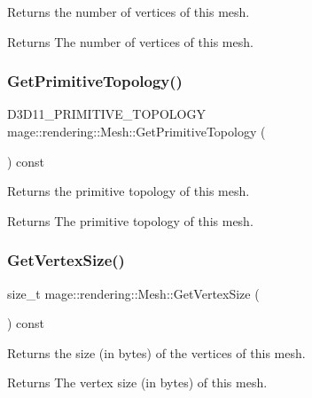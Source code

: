 Returns the number of vertices of this mesh.

\begin{DoxyReturn}{Returns}
The number of vertices of this mesh. 
\end{DoxyReturn}
\hypertarget{classmage_1_1rendering_1_1_mesh_af6cead725f7e5352a90a8f8847580f75}{}\label{classmage_1_1rendering_1_1_mesh_af6cead725f7e5352a90a8f8847580f75} 
\subsubsection{\texorpdfstring{Get\+Primitive\+Topology()}{GetPrimitiveTopology()}}
{\footnotesize\ttfamily D3\+D11\+\_\+\+P\+R\+I\+M\+I\+T\+I\+V\+E\+\_\+\+T\+O\+P\+O\+L\+O\+GY mage\+::rendering\+::\+Mesh\+::\+Get\+Primitive\+Topology (\begin{DoxyParamCaption}{ }\end{DoxyParamCaption}) const\hspace{0.3cm}{\ttfamily [noexcept]}}

Returns the primitive topology of this mesh.

\begin{DoxyReturn}{Returns}
The primitive topology of this mesh. 
\end{DoxyReturn}
\hypertarget{classmage_1_1rendering_1_1_mesh_a0fcc1a72aa5426ce9b020b580eb22a43}{}\label{classmage_1_1rendering_1_1_mesh_a0fcc1a72aa5426ce9b020b580eb22a43} 
\subsubsection{\texorpdfstring{Get\+Vertex\+Size()}{GetVertexSize()}}
{\footnotesize\ttfamily size\+\_\+t mage\+::rendering\+::\+Mesh\+::\+Get\+Vertex\+Size (\begin{DoxyParamCaption}{ }\end{DoxyParamCaption}) const\hspace{0.3cm}{\ttfamily [noexcept]}}

Returns the size (in bytes) of the vertices of this mesh.

\begin{DoxyReturn}{Returns}
The vertex size (in bytes) of this mesh. 
\end{DoxyReturn}
\hypertarget{classmage_1_1rendering_1_1_mesh_a17f6dd40e8eea41b469b475de93ee466}{}\label{classmage_1_1rendering_1_1_mesh_a17f6dd40e8eea41b469b475de93ee466} 
